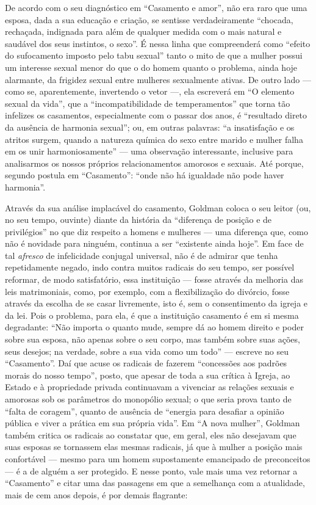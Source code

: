 De acordo com o seu diagnóstico em
``Casamento e amor'', não era raro que uma esposa, dada a sua educação e
criação, se sentisse verdadeiramente ``chocada, rechaçada, indignada
para além de qualquer medida com o mais natural e saudável dos seus
instintos, o sexo''. É nessa linha que compreenderá como ``efeito do
sufocamento imposto pelo tabu sexual'' tanto o mito de que a mulher
possui um interesse sexual menor do que o do homem quanto o problema,
ainda hoje alarmante, da frigidez sexual entre mulheres sexualmente
ativas. De outro lado --- como se, aparentemente, invertendo o vetor ---,
ela escreverá em ``O elemento sexual da vida'', que a
``incompatibilidade de temperamentos'' que torna tão infelizes os
casamentos, especialmente com o passar dos anos, é ``resultado direto da
ausência de harmonia sexual''; ou, em outras palavras: ``a insatisfação
e os atritos surgem, quando a natureza química do sexo entre marido e
mulher falha em os unir harmoniosamente'' --- uma observação
interessante, inclusive para analisarmos os nossos próprios
relacionamentos amorosos e sexuais. Até porque, segundo postula em
``Casamento'': ``onde não há igualdade não pode haver harmonia''.

Através da sua análise implacável do casamento, Goldman coloca o seu
leitor (ou, no seu tempo, ouvinte) diante da história da ``diferença de
posição e de privilégios'' no que diz respeito a homens e mulheres ---
uma diferença que, como não é novidade para ninguém, continua a ser
``existente ainda hoje''. Em face de tal \textit{afresco} de infelicidade
conjugal universal, não é de admirar que tenha repetidamente negado,
indo contra muitos radicais do seu tempo, ser possível reformar, de modo
satisfatório, essa instituição --- fosse através da melhoria das leis
matrimoniais, como, por exemplo, com a flexibilização do divórcio, fosse
através da escolha de se casar livremente, isto é, sem o consentimento
da igreja e da lei. Pois o problema, para ela, é que a instituição
casamento é em si mesma degradante: ``Não importa o quanto mude, sempre
dá ao homem direito e poder sobre sua esposa, não apenas sobre o seu
corpo, mas também sobre suas ações, seus desejos; na verdade, sobre a
sua vida como um todo'' --- escreve no seu ``Casamento''. Daí que acuse
os radicais de fazerem ``concessões aos padrões morais do nosso tempo'',
posto, que apesar de toda a sua crítica à Igreja, ao Estado e à
propriedade privada continuavam a vivenciar as relações sexuais e
amorosas sob os parâmetros do monopólio sexual; o que seria prova tanto
de ``falta de coragem'', quanto de ausência de ``energia para desafiar a
opinião pública e viver a prática em sua própria vida''. Em ``A nova
mulher'', Goldman também critica os radicais ao constatar que, em geral,
eles não desejavam que suas esposas se tornassem elas mesmas radicais,
já que à mulher a posição mais confortável --- mesmo para um homem
supostamente emancipado de preconceitos --- é a de alguém a ser
protegido. E nesse ponto, vale mais uma vez retornar a ``Casamento'' e
citar uma das passagens em que a semelhança com a atualidade, mais de
cem anos depois, é por demais flagrante:

